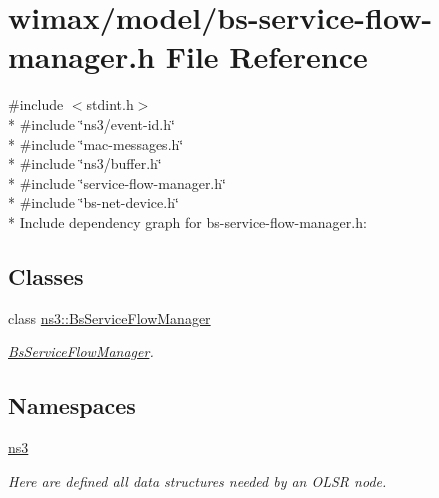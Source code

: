 \hypertarget{bs-service-flow-manager_8h}{}\section{wimax/model/bs-\/service-\/flow-\/manager.h File Reference}
\label{bs-service-flow-manager_8h}
{\ttfamily \#include $<$stdint.\+h$>$}\\*
{\ttfamily \#include \char`\"{}ns3/event-\/id.\+h\char`\"{}}\\*
{\ttfamily \#include \char`\"{}mac-\/messages.\+h\char`\"{}}\\*
{\ttfamily \#include \char`\"{}ns3/buffer.\+h\char`\"{}}\\*
{\ttfamily \#include \char`\"{}service-\/flow-\/manager.\+h\char`\"{}}\\*
{\ttfamily \#include \char`\"{}bs-\/net-\/device.\+h\char`\"{}}\\*
Include dependency graph for bs-\/service-\/flow-\/manager.h\+:
\subsection*{Classes}
\begin{DoxyCompactItemize}
\item 
class \hyperlink{classns3_1_1BsServiceFlowManager}{ns3\+::\+Bs\+Service\+Flow\+Manager}
\begin{DoxyCompactList}\small\item\em \hyperlink{classns3_1_1BsServiceFlowManager}{Bs\+Service\+Flow\+Manager}. \end{DoxyCompactList}\end{DoxyCompactItemize}
\subsection*{Namespaces}
\begin{DoxyCompactItemize}
\item 
 \hyperlink{namespacens3}{ns3}
\begin{DoxyCompactList}\small\item\em Here are defined all data structures needed by an O\+L\+SR node. \end{DoxyCompactList}\end{DoxyCompactItemize}
